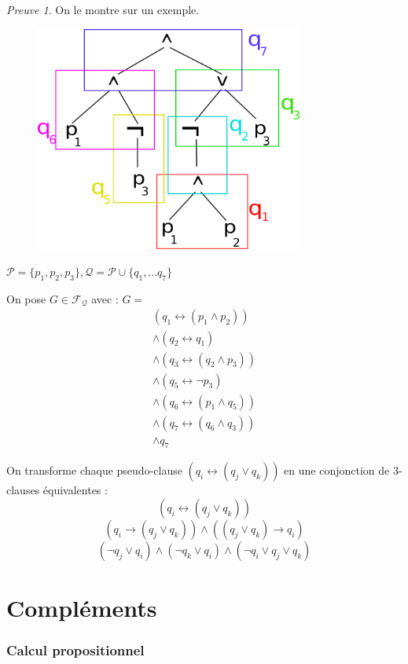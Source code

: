 \documentclass[]{article}
\theoremstyle{remark}
\newtheorem{myproof}{Preuve}
\theoremstyle{definition}
\begin{document}
\begin{myproof}
	On le montre sur un exemple.
	
	\begin{figure}[!h]
		\centering
		\includegraphics[width=250pt]{arbre_3_FND}
	\end{figure}
	
	$\mathcal{P}=\{p_1, p_2, p_3\}, \mathcal{Q}=\mathcal{P} \cup \{q_1, ... q_7\}$
	
	On pose $G \in \mathcal{F}_{\mathcal{Q}}$ avec : $G=$
	$$\begin{array}{l}
	(q_1 \leftrightarrow (p_1 \land p_2)) \\
	\land (q_2 \leftrightarrow q_1)\\
	\land (q_3 \leftrightarrow (q_2 \land p_3))\\
	\land (q_5 \leftrightarrow \neg p_3)\\
	\land (q_6 \leftrightarrow (p_1 \land q_5))\\
	\land (q_7 \leftrightarrow (q_6 \land q_3))\\
	\land q_7
	\end{array}
	$$
	
	On transforme chaque pseudo-clause $(q_i \leftrightarrow (q_j \lor q_k))$ en une conjonction de 3-clauses équivalentes :
	$$(q_i \leftrightarrow (q_j \lor q_k))$$
	$$(q_i \rightarrow (q_j \lor q_k))\land((q_j \lor q_k) \rightarrow q_i)$$
	$$(\neg q_j \lor q_i)\land (\neg q_k \lor q_i)\land(\neg q_i \lor q_j \lor q_k)$$
\end{myproof}

\part{Compléments}

\section{Calcul propositionnel}
\end{document}
